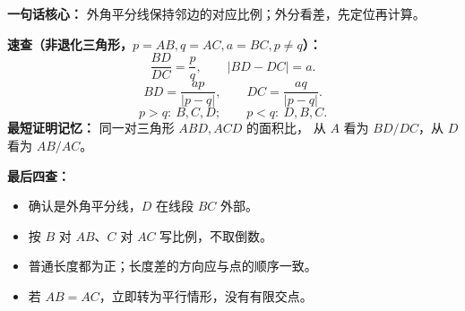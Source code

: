 \begin{summarybox}
\textbf{一句话核心：} 外角平分线保持邻边的对应比例；外分看差，先定位再计算。

\textbf{速查（非退化三角形，$p=AB,q=AC,a=BC,p\ne q$）：}
\[
 \frac{BD}{DC}=\frac pq,\qquad |BD-DC|=a.
\]
\[
 BD=\frac{ap}{|p-q|},\qquad DC=\frac{aq}{|p-q|}.
\]
\[
 p>q:\ B,C,D;\qquad p<q:\ D,B,C.
\]
\textbf{最短证明记忆：} 同一对三角形 $ABD,ACD$ 的面积比，
从 $A$ 看为 $BD/DC$，从 $D$ 看为 $AB/AC$。

\textbf{最后四查：}
\begin{itemize}[leftmargin=*]
\item 确认是外角平分线，$D$ 在线段 $BC$ 外部。
\item 按 $B$ 对 $AB$、$C$ 对 $AC$ 写比例，不取倒数。
\item 普通长度都为正；长度差的方向应与点的顺序一致。
\item 若 $AB=AC$，立即转为平行情形，没有有限交点。
\end{itemize}
\end{summarybox}
